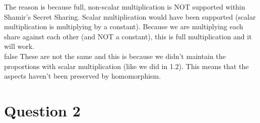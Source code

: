 \documentclass[10pt]{article}
\begin{document}
\vspace{0.1in}
\noindent The reason is because full, non-scalar multiplication is NOT supported within Shamir's Secret Sharing. Scalar multiplication would have been supported (scalar multiplication is multiplying by a constant). Because we are multiplying each share against each other (and NOT a constant), this is full multiplication and it will work. \\

\if false
\noindent These are not the same and this is because we didn't maintain the proportions with scalar multiplication (like we did in 1.2). This means that the aspects haven't been preserved by homomorphism. 
\fi






\vspace{0.2in}
\section{Question 2}
\end{document}
